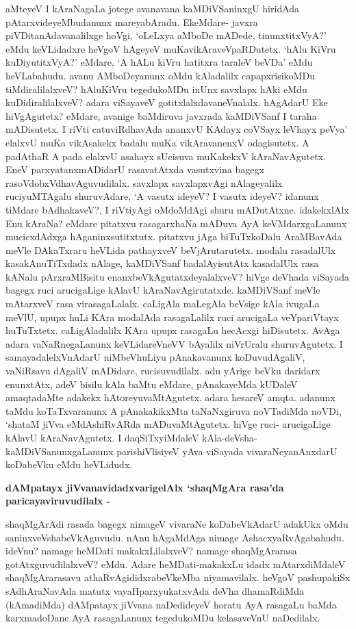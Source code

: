 aMteyeV I kAraNagaLa jotege avanavana kaMDiVSaninxgU hiridAda pAtarxvideyeMbudanunx mareyabAradu. EkeMdare- javxra piVDitanAdavanalilxge hoVgi, `oLeLxya aMboDe mADede, tinunxtitxVyA?' eMdu keVLidadxre heVgoV hAgeyeV muKavikAraveVpaRDutetx. `hAlu KiVru kuDiyutitxVyA?' eMdare, `A hALu kiVru hatitxra taraleV beVDa' eMdu heVLabahudu. avanu AMboDeyanunx oMdu kAladalilx capapxrisikoMDu tiMdiralilalxveV? hAluKiVru tegedukoMDu inUnx savxlapx hAki eMdu kuDidiralilalxveV? adara viSayaveV gotitxlalxdavaneVnalalx. hAgAdarU Eke hiVgAgutetx? eMdare, avanige baMdiruva javxrada kaMDiVSanf I taraha mADisutetx. I riVti catuviRdhavAda ananxvU KAdayx coVSayx leVhayx peVya' elalxvU muKa vikAsakekx badalu muKa vikAravanenxV odagisutetx. A padAthaR A pada elalxvU asahayx sUcisuva muKakekxV kAraNavAgutetx. EneV parxyatanxmADidarU rasavatAtxda vasutxvina bagegx rasoVdobxVdhavAguvudilalx. savxlapx savxlapxvAgi nAlageyalilx ruciyuMTAgalu shuruvAdare, `A vasutx ideyeV? I vasutx ideyeV? idanunx tiMdare bAdhakaveV?, I riVtiyAgi oMdoMdAgi shuru mADutAtxne. idakekxlAlx Enu kAraNa? eMdare pitatxvu rasagarxhaNa mADuva AyA keVMdarxgaLanunx mucicxdAdxga hAganinxsutitxtutx. pitatxvu jAga biTuTxkoDalu AraMBavAda meVle DAkaTxraru heVLida pathayxveV beVjArutarutetx. modalu rasadalUlx kasakAnuTiTxdadx nAlage, kaMDiVSanf badalAyisutAtx kasadalUlx rasa kANalu pArxraMBisitu enanxbeVkAgutatxdeyalalxveV? hiVge deVhada viSayada bagegx ruci arucigaLige kAlavU kAraNavAgirutatxde. kaMDiVSanf meVle mAtarxveV rasa virasagaLalalx. caLigAla maLegAla beVsige kAla ivugaLa meVlU, upupx huLi KAra modalAda rasagaLalilx ruci arucigaLa veYpariVtayx huTuTxtetx. caLigAladalilx KAra upupx rasagaLu hecAcxgi hiDisutetx. AvAga adara vaNaRnegaLanunx keVLidareVneVV bAyalilx niVrUralu shuruvAgutetx. I samayadalelxVnAdarU niMbeVhuLiyu pAnakavanunx koDuvudAgaliV, vaNiRsavu dAgaliV mADidare, rucisuvudilalx. adu yArige beVku daridarx enunxtAtx, adeV bisilu kAla baMtu eMdare, pAnakaveMda kUDaleV amaqtadaMte adakekx hAtoreyuvaMtAgutetx. adara hesareV amqta. adanunx taMdu koTaTxvaranunx A pAnakakikxMta taNaNxgiruva noVTadiMda noVDi, `shataM jiVva eMdAshiRvARda mADuvaMtAgutetx. hiVge ruci- arucigaLige kAlavU kAraNavAgutetx. I daqSiTxyiMdaleV kAla-deVsha-kaMDiVSanunxgaLanunx parishiVlisiyeV yAva viSayada vivaraNeyanAnxdarU koDabeVku eMdu heVLidudx.

\noindent
{\bf\large{dAMpatayx jiVvanavidadxvarigelAlx `shaqMgAra rasa'da paricayaviruvudilalx -}}\label{page221}

shaqMgArAdi rasada bagegx nimageV vivaraNe koDabeVkAdarU adakUkx oMdu saninxveVshabeVkAguvudu. nAnu hAgaMdAga nimage AshacxyaRvAgabahudu. ideVnu? namage heMDati makakxLilalxveV? namage shaqMgArarasa gotAtxguvudilalxveV? eMdu. Adare heMDati-makakxLu idadx mAtarxdiMdaleV shaqMgArarasavu athaRvAgididxrabeVkeMba niyamavilalx. heVgoV pashupakiSx sAdhAraNavAda matutx vayaHparxyukatxvAda deVha dhamaRdiMda (kAmadiMda) dAMpatayx jiVvana naDedideyeV horatu AyA rasagaLu baMda karxmadoDane AyA rasagaLanunx tegedukoMDu kelasaveVnU naDedilalx.

